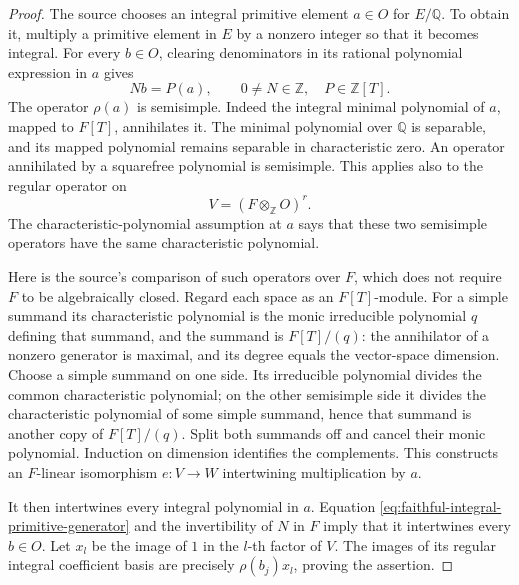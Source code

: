 \begin{proof}
The source  chooses an integral
primitive element \(a\in O\) for \(E/\mathbb Q\).
To obtain it, multiply a primitive element in \(E\) by a nonzero
integer so that it becomes integral.
For every \(b\in O\), clearing denominators in its rational
polynomial expression in \(a\) gives
\[
                    N b=P(a),\qquad
                    0\ne N\in\mathbb Z,\quad P\in\mathbb Z[T].
 \tag{ST1}\label{eq:faithful-integral-primitive-generator}
\]
The operator \(\rho(a)\) is semisimple.
Indeed the integral minimal polynomial of \(a\), mapped to \(F[T]\),
annihilates it.  The minimal polynomial over \(\mathbb Q\) is
separable, and its mapped polynomial remains separable in
characteristic zero.  An operator annihilated by a squarefree
polynomial is semisimple.  This applies also to the regular
operator on
\[
                       V=(F\otimes_{\mathbb Z}O)^r.
\]
The characteristic-polynomial assumption at \(a\) says that
these two semisimple operators have the same characteristic
polynomial.

Here is the source's comparison of such operators over \(F\),
which does not require \(F\) to be algebraically closed.
Regard each space as an \(F[T]\)-module.
For a simple summand its characteristic polynomial is the monic
irreducible polynomial \(q\) defining that summand, and the
summand is \(F[T]/(q)\): the annihilator of a nonzero generator
is maximal, and its degree equals the vector-space dimension.
Choose a simple summand on one side.  Its irreducible polynomial
divides the common characteristic polynomial; on the other
semisimple side it divides the characteristic polynomial of some
simple summand, hence that summand is another copy of \(F[T]/(q)\).
Split both summands off and cancel their monic polynomial.
Induction on dimension identifies the complements.
This constructs an \(F\)-linear isomorphism \(e:V\to W\)
intertwining multiplication by \(a\).

It then intertwines every integral polynomial in \(a\).
Equation \eqref{eq:faithful-integral-primitive-generator} and the
invertibility of \(N\) in \(F\) imply that it intertwines every
\(b\in O\).  Let \(x_l\) be the image of \(1\) in the \(l\)-th
factor of \(V\).  The images of its regular integral coefficient
basis are precisely \(\rho(b_j)x_l\), proving the assertion.
\end{proof}

